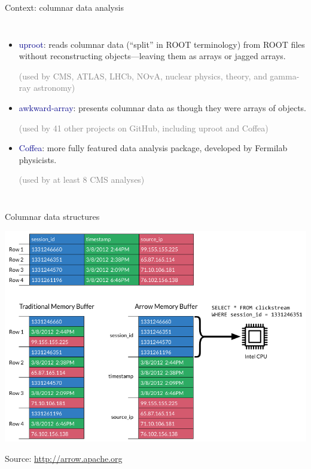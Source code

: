 \documentclass[aspectratio=169]{beamer}
\begin{document}
\begin{frame}{Context: columnar data analysis}
\large
\vspace{0.5 cm}
\begin{columns}
\begin{itemize}\setlength{\itemsep}{1 cm}
\item \textcolor{darkblue}{\Large uproot}: reads columnar data (``split'' in ROOT terminology) from ROOT files without reconstructing objects---leaving them as arrays or jagged arrays.

\vspace{0.25 cm}
\textcolor{gray}{\normalsize (used by CMS, ATLAS, LHCb, NOvA, nuclear physics, theory, and gamma-ray astronomy)}

\item \textcolor{darkblue}{\Large awkward-array}: presents columnar data as though they were arrays of objects.

\vspace{0.25 cm}
\textcolor{gray}{\normalsize (used by 41 other projects on GitHub, including uproot and Coffea)}

\item \textcolor{darkblue}{\Large Coffea}: more fully featured data analysis package, developed by Fermilab physicists.

\vspace{0.25 cm}
\textcolor{gray}{\normalsize (used by at least 8 CMS analyses)}
\end{itemize}
\end{columns}
\end{frame}

\begin{frame}{Columnar data structures}
\vspace{0.2 cm}
\begin{center}
\includegraphics[width=0.7\linewidth]{simd.png}
\end{center}

Source: \textcolor{blue}{\url{http://arrow.apache.org}}
\end{frame}
\end{document}
